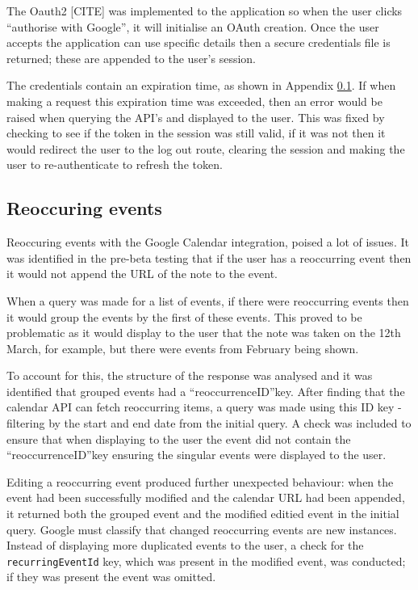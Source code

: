 {{{{{{The Oauth2 [CITE] was implemented to the application so when the user clicks ``authorise with Google'', it will initialise an OAuth creation.
Once the user accepts the application can use specific details then a secure credentials file is returned; these are appended to the user's session.

The credentials contain an expiration time, as shown in Appendix \ref{}. If when making a request this expiration time was exceeded, then an error would be raised when querying the API's and displayed to the user. This was fixed by checking to see if the token in the session was still valid, if it was not then it would redirect the user to the log out route, clearing the session and making the user to re-authenticate to refresh the token.

\subsection{Reoccuring events}
Reoccuring events with the Google Calendar integration, poised a lot of issues. It was identified in the pre-beta testing that if the user has a reoccurring event then it would not append the URL of the note to the event.

When a query was made for a list of events, if there were reoccurring events then it would group the events by the first of these events. This proved to be problematic as it would display to the user that the note was taken on the 12th March, for example, but there were events from February being shown.

To account for this, the structure of the response was analysed and it was identified that grouped events had a ``reoccurrenceID''key. After finding that the calendar API can fetch reoccurring items, a query was made using this ID key - filtering by the start and end date from the initial query. A check was included to ensure that when displaying to the user the event did not contain the ``reoccurrenceID''key ensuring the singular events were displayed to the user.

Editing a reoccurring event produced further unexpected behaviour: when the event had been successfully modified and the calendar URL had been appended, it returned both the grouped event and the modified editied event in the initial query. Google must classify that changed reoccurring events are new instances. Instead of displaying more duplicated events to the user, a check for the \texttt{recurringEventId} key, which was present in the modified event, was conducted; if they was present the event was omitted.

}}}}}}
